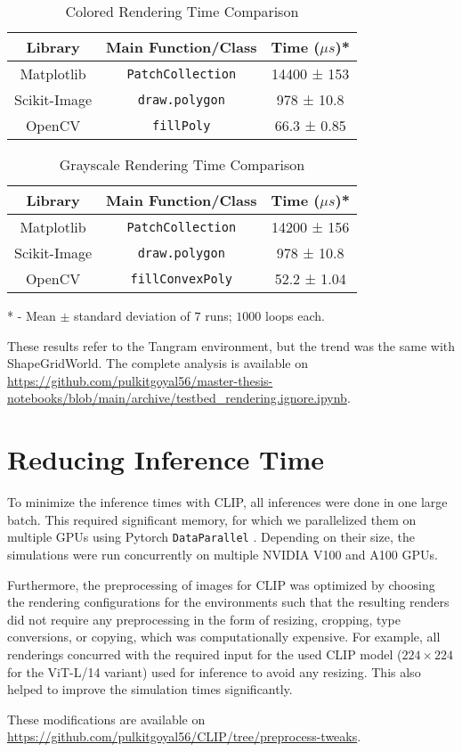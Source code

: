 \begin{table}[H]
    \centering
    \begin{tabular}[t]{@{} c c c @{}}
        \hline
        \textbf{Library} & \textbf{Main Function/Class} & \textbf{Time (\(\mu s\))*}\\
        \hline
        Matplotlib & \texttt{PatchCollection} & 14400 ± 153\\
        Scikit-Image & \texttt{draw.polygon} & 978 ± 10.8\\
        OpenCV & \texttt{fillPoly} & 66.3 ± 0.85\\
        \hline
    \end{tabular}
    \caption{Colored Rendering Time Comparison}
    \label{tab:render-time-color}
\end{table}
\begin{table}[H]
    \centering
    \begin{tabular}[t]{@{} c c c @{}}
        \hline
        \textbf{Library} & \textbf{Main Function/Class} & \textbf{Time (\(\mu s\))*}\\
        \hline
        Matplotlib & \texttt{PatchCollection} & 14200 ± 156\\
        Scikit-Image & \texttt{draw.polygon} & 978 ± 10.8\\
        OpenCV & \texttt{fillConvexPoly} & 52.2 ± 1.04\\
        \hline
    \end{tabular}
    \caption{Grayscale Rendering Time Comparison}
    \label{tab:render-time-bw}
\end{table}
* - Mean \(\pm\) standard deviation of \(7\) runs; \(1000\) loops each.

These results refer to the Tangram environment, but the trend was the same with ShapeGridWorld.
The complete analysis is available on \url{https://github.com/pulkitgoyal56/master-thesis-notebooks/blob/main/archive/testbed_rendering.ignore.ipynb}.

\section{Reducing Inference Time}
\label{sec:improving-infer}
To minimize the inference times with CLIP, all inferences were done in one large batch.
This required significant memory, for which we parallelized them on multiple GPUs using Pytorch \texttt{DataParallel} \citep{pytorch}.
Depending on their size, the simulations were run concurrently on multiple NVIDIA V100 and A100 GPUs.

Furthermore, the preprocessing of images for CLIP was optimized by choosing the rendering configurations for the environments such that the resulting renders did not require any preprocessing in the form of resizing, cropping, type conversions, or copying, which was computationally expensive.
For example, all renderings concurred with the required input for the used CLIP model (\(224 \times 224\) for the ViT-L/14 variant) used for inference to avoid any resizing.
This also helped to improve the simulation times significantly.

These modifications are available on \url{https://github.com/pulkitgoyal56/CLIP/tree/preprocess-tweaks}.

